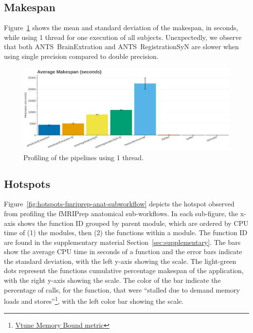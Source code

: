 \documentclass[conference]{IEEEtran}
\begin{document}

\subsection{Makespan}
Figure~\ref{fig:makespan-1thread} shows the mean and standard deviation of the makespan, in seconds, while using 1 thread for one execution of all subjects.
Unexpectedly, we observe that both ANTS~BrainExtration and ANTS~RegistrationSyN are slower when using single precision compared to double precision.
\begin{figure}[h]
	\centering
	\includegraphics[width=\linewidth]{figures/makespan-1thread.png}
	\caption{Profiling of the pipelines using 1 thread.}
	\label{fig:makespan-1thread}
\end{figure}

\subsection{Hotspots}
Figure~\ref{fig:hotspots-fmriprep-anat-subworkflow} depicts the hotspot observed from profiling the fMRIPrep anatomical sub-workflows. In each sub-figure, the x-axis shows the function ID grouped by parent module, which are ordered by CPU time of (1) the modules, then (2) the functions within a module. The function ID are found in the supplementary material Section~\ref{sec:supplementary}. The bars show the average CPU time in seconds of a function and the error bars indicate the standard deviation, with the left y-axis showing the scale. The light-green dots represent the functions cumulative percentage makespan of the application, with the right y-axis showing the scale. The color of the bar indicate the percentage of calls, for the function, that were ``stalled due to demand memory loads and stores''\footnote{\href{https://www.intel.com/content/www/us/en/docs/vtune-profiler/user-guide/2023-0/cpu-metrics-reference.html\#MEMORY-BOUND}{Vtune Memory Bound metric}}, with the left color bar showing the scale.
\end{document}
